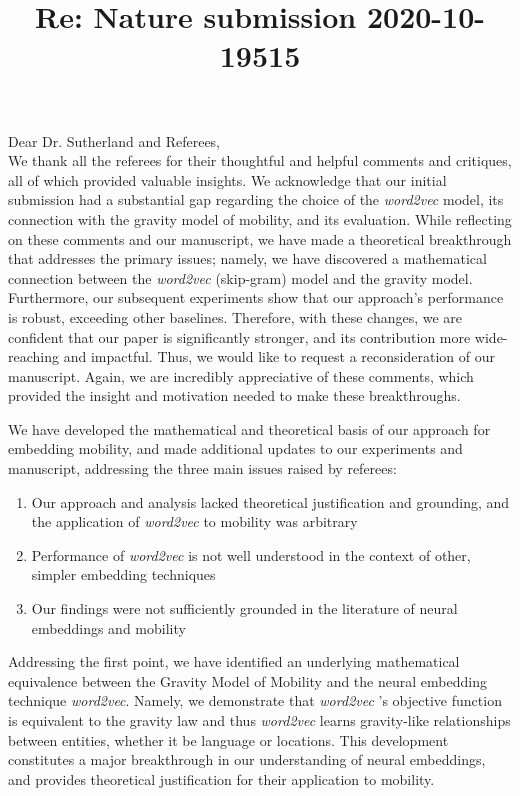 \documentclass[12pt,a4paper]{article}
\title{Re: Nature submission 2020-10-19515}
\date{}
\makeatletter
\renewcommand{\maketitle}{\bgroup\setlength{\parindent}{0pt}
\begin{flushleft}
\Large  \textbf{\@title}
\end{flushleft}\egroup
}
\makeatother
\begin{document}
\maketitle

\bigskip
\noindent Dear Dr. Sutherland and Referees, \\

We thank all the referees for their thoughtful and helpful comments and critiques, all of which provided valuable insights.
We acknowledge that our initial submission had a substantial gap regarding the choice of the \textit{word2vec} model, its connection with the gravity model of mobility, and its evaluation. 
While reflecting on these comments and our manuscript, we have made a theoretical breakthrough that addresses the primary issues;
namely, we have discovered a mathematical connection between the \textit{word2vec} (skip-gram) model and the gravity model. 
Furthermore, our subsequent experiments show that our approach's performance is robust, exceeding other baselines. 
Therefore, with these changes, we are confident that our paper is significantly stronger, and its contribution more wide-reaching and impactful.
Thus, we would like to request a reconsideration of our manuscript. 
Again, we are incredibly appreciative of these comments, which provided the insight and motivation needed to make these breakthroughs.

We have developed the mathematical and theoretical basis of our approach for embedding mobility, and made additional updates to our experiments and manuscript, addressing the three main issues raised by referees:

\begin{enumerate}
	\itemsep0em
	\item Our approach and analysis lacked theoretical justification and grounding, and the application of \textit{word2vec} to mobility was arbitrary
	\item Performance of \textit{word2vec} is not well understood in the context of other, simpler embedding techniques
	\item Our findings were not sufficiently grounded in the literature of neural embeddings and mobility
\end{enumerate}

Addressing the first point, we have identified an underlying mathematical equivalence between the Gravity Model of Mobility and the neural embedding technique \textit{word2vec}.
Namely, we demonstrate that \textit{word2vec} 's objective function is equivalent to the gravity law and thus \textit{word2vec} learns gravity-like relationships between entities, whether it be language or locations.
This development constitutes a major breakthrough in our understanding of neural embeddings, and provides theoretical justification for their application to mobility.
\end{document}
